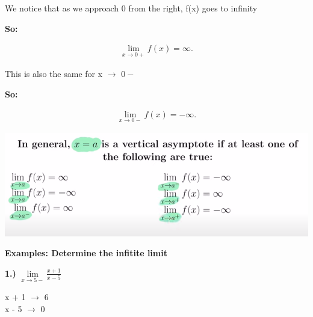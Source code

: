 \documentclass{report}
\begin{document}
    \bigbreak \noindent 
    We notice that as we approach 0 from the right, f(x) goes to infinity

    \bigbreak \noindent 
    \textbf{So:}
    
    \begin{large}
        \begin{align*}
            \lim\limits_{x \to 0+}{f(x) = \infty}
        .\end{align*}
    \end{large}
    
    \bigbreak \noindent 
    This is also the same for x $\rightarrow$ $0-$
    
    \bigbreak \noindent 
    \textbf{So:}

    \begin{large}
        \begin{align*}
            \lim\limits_{x \to 0-}{f \left(x\right) = -\infty}
        .\end{align*}
    \end{large}

    \bigbreak \noindent 

    \begin{center}
        \includegraphics[scale=0.5]{../images/ass.png}
    \end{center}

    \bigbreak \noindent \bigbreak \noindent 
    \begin{large}
       \textbf{Examples: Determine the infitite limit} 
    \end{large}

    \bigbreak \noindent 
    \begin{large}
       \textbf{1.)} $\lim\limits_{x \to 5-}{ \frac{x+1}{x-5}}$ 
    \end{large}
    
    \bigbreak \noindent \bigbreak \noindent 
    \begin{center}
        \begin{large}
            x + 1 $\longrightarrow$ 6 \\
            x - 5 $\longrightarrow$ 0 
        \end{large}
    \end{center}
\end{document}
